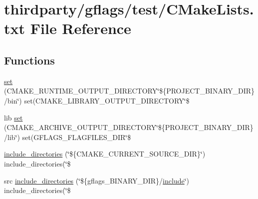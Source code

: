\hypertarget{thirdparty_2gflags_2test_2CMakeLists_8txt}{}\section{thirdparty/gflags/test/\+C\+Make\+Lists.txt File Reference}
\label{thirdparty_2gflags_2test_2CMakeLists_8txt}
\subsection*{Functions}
\begin{DoxyCompactItemize}
\item 
\hyperlink{thirdparty_2gflags_2test_2CMakeLists_8txt_ae2284b3a5052f6e2dfaf12265f0d4ed6}{set} (C\+M\+A\+K\+E\+\_\+\+R\+U\+N\+T\+I\+M\+E\+\_\+\+O\+U\+T\+P\+U\+T\+\_\+\+D\+I\+R\+E\+C\+T\+O\+RY\char`\"{}\$\{P\+R\+O\+J\+E\+C\+T\+\_\+\+B\+I\+N\+A\+R\+Y\+\_\+\+D\+IR\}/bin\char`\"{}) set(C\+M\+A\+K\+E\+\_\+\+L\+I\+B\+R\+A\+R\+Y\+\_\+\+O\+U\+T\+P\+U\+T\+\_\+\+D\+I\+R\+E\+C\+T\+O\+RY\char`\"{}\$
\item 
lib \hyperlink{thirdparty_2gflags_2test_2CMakeLists_8txt_aed8cdd0ccd70519e5f2523d3a9f63075}{set} (C\+M\+A\+K\+E\+\_\+\+A\+R\+C\+H\+I\+V\+E\+\_\+\+O\+U\+T\+P\+U\+T\+\_\+\+D\+I\+R\+E\+C\+T\+O\+RY\char`\"{}\$\{P\+R\+O\+J\+E\+C\+T\+\_\+\+B\+I\+N\+A\+R\+Y\+\_\+\+D\+IR\}/lib\char`\"{}) set(G\+F\+L\+A\+G\+S\+\_\+\+F\+L\+A\+G\+F\+I\+L\+E\+S\+\_\+\+D\+IR\char`\"{}\$
\item 
\hyperlink{thirdparty_2gflags_2test_2CMakeLists_8txt_ab8430a069fa1a5e1983a22a36c8a4fc4}{include\+\_\+directories} (\char`\"{}\$\{C\+M\+A\+K\+E\+\_\+\+C\+U\+R\+R\+E\+N\+T\+\_\+\+S\+O\+U\+R\+C\+E\+\_\+\+D\+IR\}\char`\"{}) include\+\_\+directories(\char`\"{}\$
\item 
src \hyperlink{thirdparty_2gflags_2test_2CMakeLists_8txt_a667ad27fbd5d1052dedd4736401ec6fb}{include\+\_\+directories} (\char`\"{}\$\{gflags\+\_\+\+B\+I\+N\+A\+R\+Y\+\_\+\+D\+IR\}/\hyperlink{CMakeCache_8txt_a986ccfc90e04633694fe6cff5472be19}{include}\char`\"{}) include\+\_\+directories(\char`\"{}\$
\item 

\end{DoxyCompactItemize}
